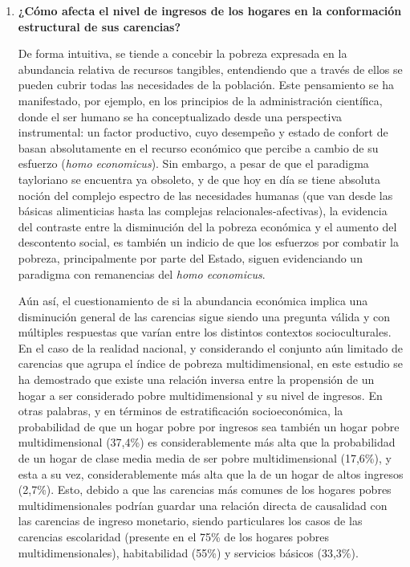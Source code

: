 \documentclass[12pt,letterpaper,spanish]{article}
\begin{document}
\begin{enumerate}

\item \textbf{¿Cómo afecta el nivel de ingresos de los hogares en la conformación estructural de sus carencias?}


De forma intuitiva, se tiende a concebir la pobreza expresada en la abundancia relativa de recursos tangibles, entendiendo que a través de ellos se pueden cubrir todas las necesidades de la población. Este pensamiento se ha manifestado, por ejemplo, en los principios de la administración científica, donde el ser humano se ha conceptualizado desde una perspectiva instrumental: un factor productivo, cuyo desempeño y estado de confort de basan absolutamente en el recurso económico que percibe a cambio de su esfuerzo (\textit{homo economicus}). Sin embargo,  a pesar de que el paradigma tayloriano se encuentra ya obsoleto, y de que hoy en día se tiene absoluta noción del complejo espectro de las necesidades humanas (que van desde las básicas alimenticias hasta las complejas relacionales-afectivas), la evidencia del contraste entre la disminución del la pobreza económica y el aumento del descontento social, es también un indicio de que los esfuerzos por combatir la pobreza, principalmente por parte del Estado, siguen evidenciando un paradigma con remanencias del \textit{homo economicus}. 


Aún así, el cuestionamiento de si la abundancia económica implica una disminución general de las carencias sigue siendo una pregunta válida y con múltiples respuestas que varían entre los distintos contextos socioculturales. En el caso de la realidad nacional, y considerando el conjunto aún limitado de carencias que agrupa el índice de pobreza multidimensional, en este estudio se ha demostrado que existe una relación inversa entre la propensión de un hogar a ser considerado pobre multidimensional y su nivel de ingresos. En otras palabras, y en términos de estratificación socioeconómica, la probabilidad de que un hogar pobre por ingresos sea también un hogar pobre multidimensional (37,4\%) es considerablemente más alta que la probabilidad de un hogar de clase media media de ser pobre multidimensional (17,6\%), y esta a su vez, considerablemente más alta que la de un hogar de altos ingresos (2,7\%).  Esto, debido a que las carencias más comunes de los hogares pobres multidimensionales podrían guardar una relación directa de causalidad con las carencias de ingreso monetario, siendo particulares los casos de las carencias escolaridad (presente en el 75\% de los hogares pobres multidimensionales), habitabilidad (55\%) y servicios básicos (33,3\%). 



\end{enumerate}
\end{document}
